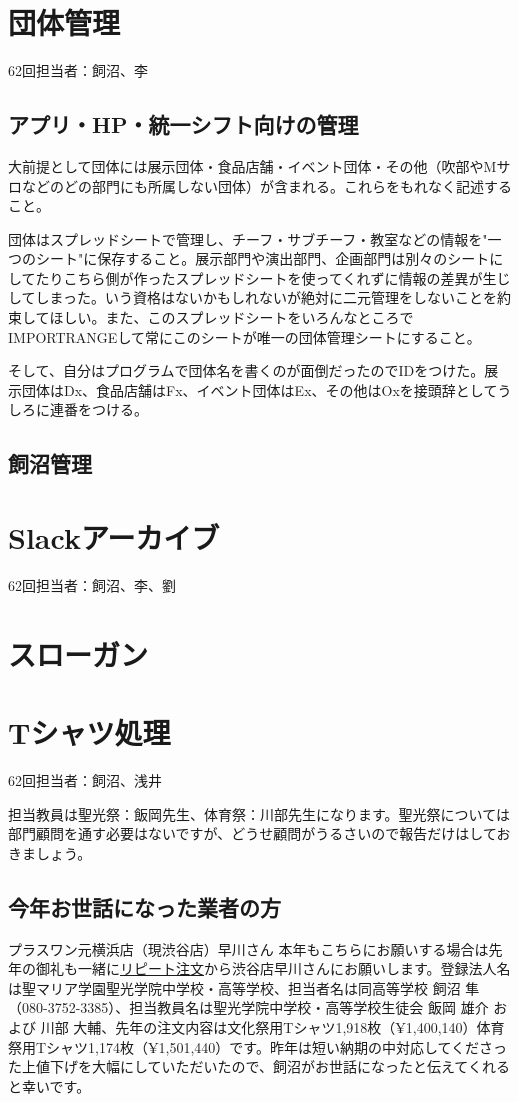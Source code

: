 \documentclass[a4paper]{ltjsreport}
\newcommand{\link}[2]{\href{#2}{#1}}
\begin{document}
\section{団体管理}
62回担当者：飼沼、李
\subsection{アプリ・HP・統一シフト向けの管理}
大前提として団体には展示団体・食品店舗・イベント団体・その他（吹部やMサロなどのどの部門にも所属しない団体）が含まれる。これらをもれなく記述すること。

団体はスプレッドシートで管理し、チーフ・サブチーフ・教室などの情報を"一つのシート"に保存すること。展示部門や演出部門、企画部門は別々のシートにしてたりこちら側が作ったスプレッドシートを使ってくれずに情報の差異が生じしてしまった。いう資格はないかもしれないが絶対に二元管理をしないことを約束してほしい。また、このスプレッドシートをいろんなところでIMPORTRANGEして常にこのシートが唯一の団体管理シートにすること。

そして、自分はプログラムで団体名を書くのが面倒だったのでIDをつけた。展示団体はDx、食品店舗はFx、イベント団体はEx、その他はOxを接頭辞としてうしろに連番をつける。
\subsection{飼沼管理}

\section{Slackアーカイブ}
62回担当者：飼沼、李、劉


\section{スローガン}

\section{Tシャツ処理}
62回担当者：飼沼、浅井

担当教員は聖光祭：飯岡先生、体育祭：川部先生になります。聖光祭については部門顧問を通す必要はないですが、どうせ顧問がうるさいので報告だけはしておきましょう。

\subsection{今年お世話になった業者の方}
プラスワン元横浜店（現渋谷店）早川さん
本年もこちらにお願いする場合は先年の御礼も一緒に\link{リピート注文}{https://www.p1-intl.com/contents/repeat.html}から渋谷店早川さんにお願いします。登録法人名は聖マリア学園聖光学院中学校・高等学校、担当者名は同高等学校 飼沼 隼（080-3752-3385）、担当教員名は聖光学院中学校・高等学校生徒会 飯岡 雄介 および 川部 大輔、先年の注文内容は文化祭用Tシャツ1,918枚（¥1,400,140）体育祭用Tシャツ1,174枚（¥1,501,440）です。昨年は短い納期の中対応してくださった上値下げを大幅にしていただいたので、飼沼がお世話になったと伝えてくれると幸いです。
\end{document}
